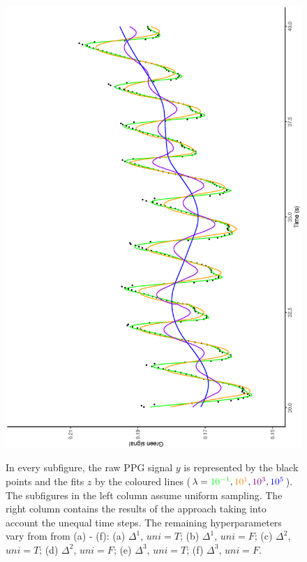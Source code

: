 \documentclass[twocolumn]{bmcart}%
\begin{document}
\begin{figure}[p]
\begin{center}
{{    				\includegraphics[width =\linewidth,angle=270]{pues1d3}
        		        }
		}\\ 	%

     \end{center}
       	\caption{ 
	In every subfigure, the raw PPG signal $y$ is represented by the black points and the fits $z$ by the coloured lines ($\lambda = \textcolor{green}{10^{-1}}, \textcolor{orange}{10^1}, \textcolor{violet}{10^3},  \textcolor{blue}{10^5}$). 
	The subfigures in the left column assume uniform sampling.
	The right column contains the results of the approach taking into account the unequal time steps.
	The remaining hyperparameters vary from from (a) - (f): (a) $\Delta ^1$, $uni = T$; (b) $\Delta ^1$, $uni = F$; (c) $\Delta ^2$, $uni = T$; (d) $\Delta ^2$, $uni = F$; (e) $\Delta ^3$, $uni = T$; (f) $\Delta ^3$, $uni = F$.}
     	  \label{fig:rawsmoothed}

\end{figure}
\end{document}
